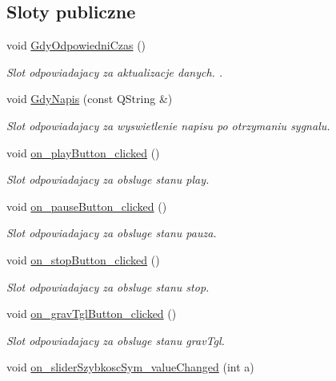 \subsection*{Sloty publiczne}
\begin{DoxyCompactItemize}
\item 
void \hyperlink{class_okno_glowne_a2a49d3696ef8a42325313842768f2c92}{Gdy\-Odpowiedni\-Czas} ()
\begin{DoxyCompactList}\small\item\em Slot odpowiadajacy za aktualizacje danych. . \end{DoxyCompactList}\item 
void \hyperlink{class_okno_glowne_a2a59f13292adfead4ac821780220044a}{Gdy\-Napis} (const Q\-String \&)
\begin{DoxyCompactList}\small\item\em Slot odpowiadajacy za wyswietlenie napisu po otrzymaniu sygnalu. \end{DoxyCompactList}\item 
void \hyperlink{class_okno_glowne_ac837b1f8c8b0288d07987e059966431b}{on\-\_\-play\-Button\-\_\-clicked} ()
\begin{DoxyCompactList}\small\item\em Slot odpowiadajacy za obsluge stanu play. \end{DoxyCompactList}\item 
void \hyperlink{class_okno_glowne_ae8bd560de9aa835ba8b194b8f7da094c}{on\-\_\-pause\-Button\-\_\-clicked} ()
\begin{DoxyCompactList}\small\item\em Slot odpowiadajacy za obsluge stanu pauza. \end{DoxyCompactList}\item 
void \hyperlink{class_okno_glowne_a63255adc6263a1ee6f67c96b91446b73}{on\-\_\-stop\-Button\-\_\-clicked} ()
\begin{DoxyCompactList}\small\item\em Slot odpowiadajacy za obsluge stanu stop. \end{DoxyCompactList}\item 
void \hyperlink{class_okno_glowne_a0c07c0f31c7b79e053ffb6e606ff5293}{on\-\_\-grav\-Tgl\-Button\-\_\-clicked} ()
\begin{DoxyCompactList}\small\item\em Slot odpowiadajacy za obsluge stanu grav\-Tgl. \end{DoxyCompactList}\item 
void \hyperlink{class_okno_glowne_a726ce3fbe89c3fb7364c39e99c0ad658}{on\-\_\-slider\-Szybkosc\-Sym\-\_\-value\-Changed} (int a)

\end{DoxyCompactItemize}
